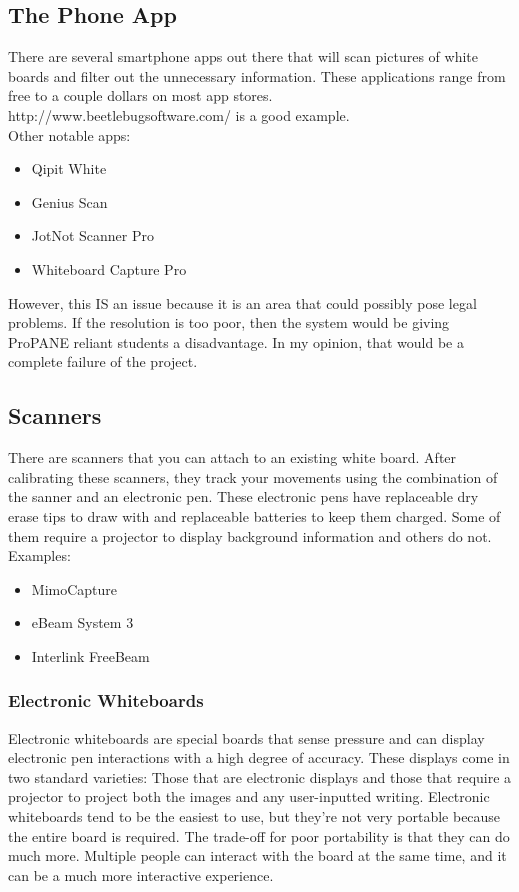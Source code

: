 \documentclass[]{article}
\begin{document}
		\subsection{The Phone App}
			There are several smartphone apps out there that will scan pictures of white boards and filter out the unnecessary information. These applications range from free to a couple dollars on most app stores.\\
				http://www.beetlebugsoftware.com/ is a good example. \\

				Other notable apps:
					\begin{itemize}
						\item Qipit White
						\item Genius Scan
						\item JotNot Scanner Pro
						\item Whiteboard Capture Pro
					\end{itemize}

			However, this IS an issue because it is an area that could possibly pose legal problems. If the resolution is too poor, then the system would be giving ProPANE reliant students a disadvantage. In my opinion, that would be a complete failure of the project.\\
			
		\subsection{Scanners}
			There are scanners that you can attach to an existing white board. After calibrating these scanners, they track your movements using the combination of the sanner and an electronic pen. These electronic pens have replaceable dry erase tips to draw with and replaceable batteries to keep them charged. Some of them require a projector to display background information and others do not.\\

			Examples:
				\begin{itemize}
					\item MimoCapture
					\item eBeam System 3
					\item Interlink FreeBeam
				\end{itemize}

			
		\subsubsection{Electronic Whiteboards}
			Electronic whiteboards are special boards that sense pressure and can display electronic pen interactions with a high degree of accuracy. These displays come in two standard varieties: Those that are electronic displays and those that require a projector to project both the images and any user-inputted writing. Electronic whiteboards tend to be the easiest to use, but they're not very portable because the entire board is required. The trade-off for poor portability is that they can do much more. Multiple people can interact with the board at the same time, and it can be a much more interactive experience. \\
\end{document}
